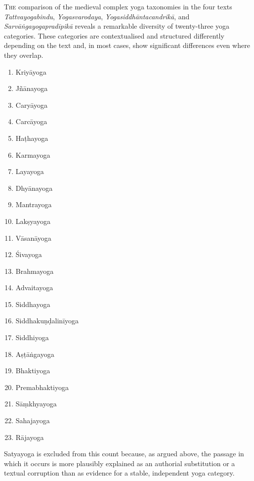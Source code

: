 \lettrine{T}{he} comparison of the medieval complex yoga taxonomies in the four texts \textit{Tattvayogabindu}, \textit{Yogasvarodaya}, \textit{Yogasiddhāntacandrikā}, and \textit{Sarvāṅgayogapradīpikā} reveals a remarkable diversity of twenty-three yoga categories. These categories are contextualised and structured differently depending on the text and, in most cases, show significant differences even where they overlap.

\begin{enumerate}
\item Kriyāyoga
\item Jñānayoga
\item Caryāyoga
\item Carcāyoga
\item Haṭhayoga
\item Karmayoga
\item Layayoga
\item Dhyānayoga
\item Mantrayoga
\item Lakṣyayoga
\item Vāsanāyoga
\item Śivayoga
\item Brahmayoga
\item Advaitayoga
\item Siddhayoga
\item Siddhakuṇḍalinīyoga 
\item Siddhiyoga
\item Aṣṭāṅgayoga
\item Bhaktiyoga
\item Premabhaktiyoga
\item Sāṃkhyayoga
\item Sahajayoga
\item Rājayoga
\end{enumerate}

Satyayoga is excluded from this count because, as argued above, the passage in which it occurs is more plausibly explained as an authorial substitution or a textual corruption than as evidence for a stable, independent yoga category.

